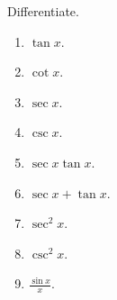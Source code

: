 Differentiate.

\begin{multicols}{2}
\begin{enumerate}
\item $\tan x$.

\item $\cot x$.

\item $\sec x$.

\item $\csc x$.

\item $\sec x\tan x$.

\item $\sec x+\tan x$.

\item $\sec^2 x$.

\item $\csc^2 x$.

\item $\displaystyle \frac{\sin x}{x}$.

\end{enumerate}

\end{multicols}